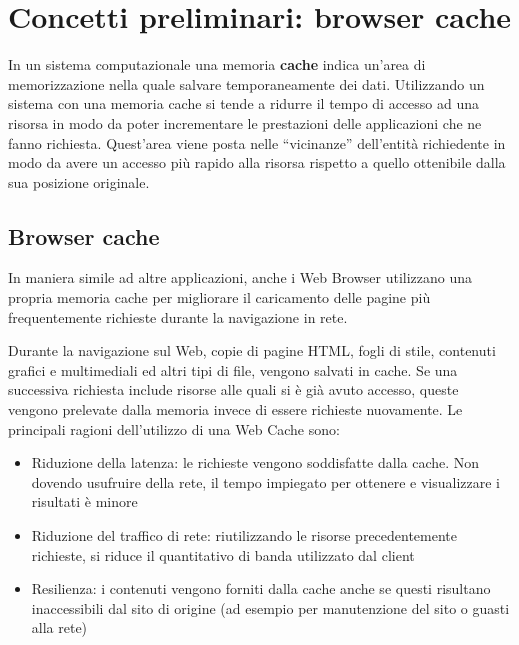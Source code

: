 \chapter{Concetti preliminari: browser cache}

In un sistema computazionale una memoria \textbf{cache} indica un'area di memorizzazione nella quale salvare temporaneamente dei dati.
Utilizzando un sistema con una memoria cache si tende a ridurre il tempo di accesso ad una risorsa in modo da poter incrementare le prestazioni delle applicazioni che ne fanno richiesta. 
Quest'area viene posta nelle ``vicinanze'' dell'entità richiedente in modo da avere un accesso più rapido alla risorsa rispetto a quello ottenibile dalla sua posizione originale.
 
\section {Browser cache}

In maniera simile ad altre applicazioni, anche i Web Browser utilizzano una propria memoria cache per migliorare il caricamento delle pagine più frequentemente richieste durante la navigazione in rete. \nocite{Elling}

Durante la navigazione sul Web, copie di pagine HTML, fogli di stile, contenuti grafici e multimediali ed altri tipi di file, vengono salvati in cache. Se una successiva richiesta include risorse alle quali si è già avuto accesso, queste vengono prelevate dalla memoria invece di essere richieste nuovamente. Le principali ragioni dell'utilizzo di una Web Cache sono:
\nocite{Nottingham}

\begin{itemize}
	
	\item{Riduzione della latenza: le richieste vengono soddisfatte dalla cache. Non dovendo usufruire della rete, il tempo impiegato per ottenere e visualizzare i risultati è minore}
	
	\item{Riduzione del traffico di rete: riutilizzando le risorse precedentemente richieste, si riduce il quantitativo di banda utilizzato dal client}
	
	\item{Resilienza: i contenuti vengono forniti dalla cache anche se questi risultano inaccessibili dal sito di origine (ad esempio per manutenzione del sito o guasti alla rete)}

\end{itemize}

